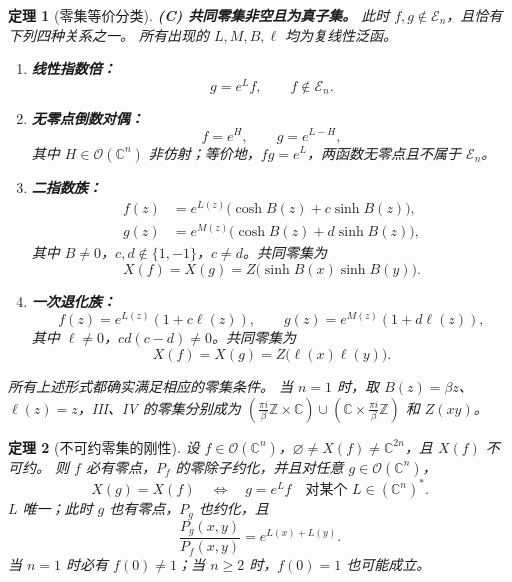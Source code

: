 \documentclass[11pt,a4paper,oneside,openany]{book}
\theoremstyle{lecture}
\newtheorem{theorem}{定理}[section]
\newcommand{\C}{\mathbb C}
\newcommand{\Z}{\mathbb Z}
\newcommand{\OO}{\mathcal O}
\newcommand{\En}{\mathcal E_n}
\numberwithin{equation}{section}
\begin{document}
\begin{theorem}[零集等价分类]
\textbf{(C) 共同零集非空且为真子集。} 此时 $f,g\notin\En$，且恰有下列四种关系之一。
所有出现的 $L,M,B,\ell$ 均为复线性泛函。
\begin{enumerate}[label=\textbf{\Roman*.},leftmargin=2.2em]
\item \textbf{线性指数倍：}
\begin{equation}\label{an:eq:typeI}
 g=e^L f,\qquad f\notin\En.
\end{equation}
\item \textbf{无零点倒数对偶：}
\begin{equation}\label{an:eq:typeII}
 f=e^H,\qquad g=e^{L-H},
\end{equation}
其中 $H\in\OO(\C^n)$ 非仿射；等价地，$fg=e^L$，两函数无零点且不属于 $\En$。
\item \textbf{二指数族：}
\begin{equation}\label{an:eq:typeIII}
 \begin{aligned}
 f(z)&=e^{L(z)}\bigl(\cosh B(z)+c\sinh B(z)\bigr),\\
 g(z)&=e^{M(z)}\bigl(\cosh B(z)+d\sinh B(z)\bigr),
 \end{aligned}
\end{equation}
其中 $B\ne0$，$c,d\notin\{1,-1\}$，$c\ne d$。共同零集为
\begin{equation}\label{an:eq:gridclass}
 X(f)=X(g)=Z\bigl(\sinh B(x)\sinh B(y)\bigr).
\end{equation}
\item \textbf{一次退化族：}
\begin{equation}\label{an:eq:typeIV}
 f(z)=e^{L(z)}(1+c\ell(z)),\qquad
 g(z)=e^{M(z)}(1+d\ell(z)),
\end{equation}
其中 $\ell\ne0$，$cd(c-d)\ne0$。共同零集为
\begin{equation}\label{an:eq:axesclass}
 X(f)=X(g)=Z\bigl(\ell(x)\ell(y)\bigr).
\end{equation}
\end{enumerate}
所有上述形式都确实满足相应的零集条件。
当 $n=1$ 时，取 $B(z)=\beta z$、$\ell(z)=z$，III、IV 的零集分别成为
$(\frac{\pi i}{\beta}\Z\times\C)\cup(\C\times\frac{\pi i}{\beta}\Z)$ 和 $Z(xy)$。
\end{theorem}

\begin{theorem}[不可约零集的刚性]\label{an:thm:irr-main}
设 $f\in\OO(\C^n)$，$\varnothing\ne X(f)\ne\C^{2n}$，且 $X(f)$ 不可约。
则 $f$ 必有零点，$P_f$ 的零除子约化，并且对任意 $g\in\OO(\C^n)$，
\begin{equation}\label{an:eq:irrequiv}
 X(g)=X(f)\quad\Longleftrightarrow\quad
 g=e^L f\quad\text{对某个 }L\in(\C^n)^*.
\end{equation}
$L$ 唯一；此时 $g$ 也有零点，$P_g$ 也约化，且
\begin{equation}\label{an:eq:irredunit}
 \frac{P_g(x,y)}{P_f(x,y)}=e^{L(x)+L(y)}.
\end{equation}
当 $n=1$ 时必有 $f(0)\ne1$；当 $n\ge2$ 时，$f(0)=1$ 也可能成立。
\end{theorem}
\end{document}
